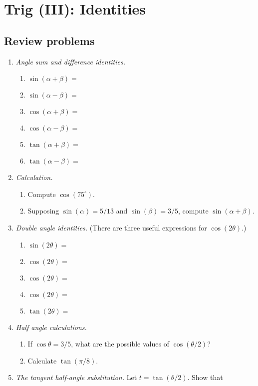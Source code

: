 \section{Trig (III): Identities}

\subsection{Review problems}

\begin{enumerate}
\item \emph{Angle sum and difference identities.}
\begin{enumerate}
\item $\sin(\alpha + \beta) = $
\item $\sin(\alpha - \beta) = $
\item $\cos(\alpha + \beta) = $
\item $\cos(\alpha - \beta) = $
\item $\tan(\alpha + \beta) = $
\item $\tan(\alpha - \beta) = $
\end{enumerate}
\item \emph{Calculation.}
\begin{enumerate}
\item Compute $\cos(75^{\circ})$.
\item Supposing $\sin(\alpha) = 5/13$ and $\sin(\beta) = 3/5$, compute $\sin(\alpha + \beta)$.
\end{enumerate}
\item \emph{Double angle identities.} (There are three useful expressions for $\cos(2\theta)$.)
\begin{enumerate}
\item $\sin(2\theta) = $
\item $\cos(2\theta) = $
\item $\cos(2\theta) = $
\item $\cos(2\theta) = $
\item $\tan(2\theta) = $
\end{enumerate}
\item \emph{Half angle calculations.}
\begin{enumerate}
\item If $\cos\theta = 3/5$, what are the possible values of $\cos(\theta/2)$?
\item Calculate $\tan(\pi/8)$.
\end{enumerate}
\item \emph{The tangent half-angle substitution.} Let $t = \tan(\theta/2)$. Show that

\end{enumerate}
